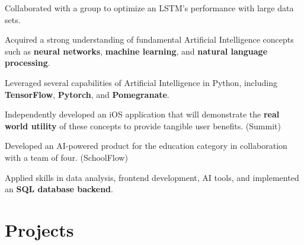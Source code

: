 \documentclass[letterpaper,10pt]{article}
\begin{document}
  \begin{resume_list}
    \item Collaborated with a group to optimize an LSTM's performance with large data sets.
    \vspace{2pt}
  \end{resume_list}

  \begin{resume_list}
    \item Acquired a strong understanding of fundamental Artificial Intelligence concepts such as \textbf{neural networks}, \textbf{machine learning}, and \textbf{natural language processing}.
    \vspace{1pt}
    \item Leveraged several capabilities of Artificial Intelligence in Python, including \textbf{TensorFlow}, \textbf{Pytorch}, and \textbf{Pomegranate}.
    \vspace{1pt}
    \item Independently developed an iOS application that will demonstrate the \textbf{real world utility} of these concepts to provide tangible user benefits. (Summit)
    \vspace{2pt}
  \end{resume_list}

  \begin{resume_list}
    \item Developed an AI-powered product for the education category in collaboration with a team of four. (SchoolFlow)
    \vspace{1pt}
    \item Applied skills in data analysis, frontend development, AI tools, and implemented an \textbf{SQL database backend}.
    \vspace{-2pt}
  \end{resume_list}

  \section{\large{Projects}}
\end{document}
